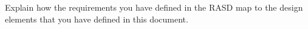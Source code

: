 Explain how the requirements you have defined in the RASD map to the design elements that you have defined in this document.